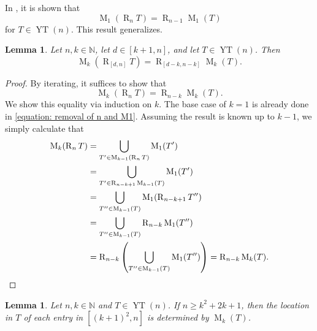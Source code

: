 \documentclass[12pt]{amsart}
\newtheorem{lemma}[theorem]{Lemma}
\theoremstyle{definition}
\theoremstyle{remark}
\numberwithin{equation}{section}
\numberwithin{figure}{section}
\newcommand{\YT}{\operatorname{YT}}
\newcommand{\M}{\operatorname{M}}
\newcommand{\R}{\operatorname{R}}
\newcommand{\N}{\mathbb{N}}
\begin{document}
In \cite[Lemma 3.3]{CainLehtonen2022}, it is shown that
\begin{equation} \label{equation: removal of n and M1}
    \M_1(\R_n T) = \R_{n-1} \M_1(T)
\end{equation}
for $T \in \YT(n)$. This result generalizes.

\begin{lemma} \label{lemma: removal of top elements and Mk}
    Let $n,k \in \N$, let $d \in [k+1,n]$, and let $T \in \YT(n)$. Then
        \[ \M_k (\R_{[d, n]} T) = \R_{[d-k, n-k]} \M_k (T). \]
\end{lemma}

\begin{proof}
    By iterating, it suffices to show that
    \[ \M_k (\R_{n} T) = \R_{n-k} \M_k (T). \]
    We show this equality via induction on $k$.
    The base case of $k = 1$ is already done in \eqref{equation: removal of n and M1}. Assuming the result is known up to $k - 1$, we simply calculate that
    \begin{align*}
        \M_k(\R_n T) &= \bigcup_{T' \in \M_{k-1}(\R_n T)} \M_1( T' ) \\
                    &= \bigcup_{T' \in \R_{n-k+1}\M_{k-1}(T)} \M_1( T' ) \\
                    &= \bigcup_{T'' \in \M_{k-1}(T)} \M_1( \R_{n-k+1} T'' ) \\
                    &= \bigcup_{T'' \in \M_{k-1}(T)} \R_{n-k} \M_1( T'' ) \\
                    &= \R_{n-k} \left(\bigcup_{T'' \in \M_{k-1}(T)} \M_1( T'' )\right)
                    = \R_{n-k} \M_k(T).\qedhere
    \end{align*}
\end{proof}



\begin{lemma}
\label{lemma:location of k2 + 2k through n}
    Let $n,k \in \N$ and $T \in \YT(n)$. If $n \geq k^2 + 2k + 1$, then the location in $T$ of each entry in $[(k+1)^2, n]$ is determined by $\M_k(T)$.
\end{lemma}
\end{document}

